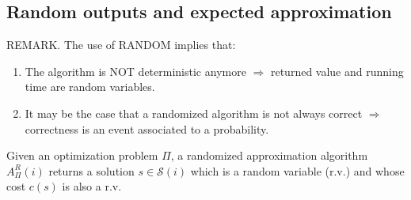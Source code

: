 \subsection{Random outputs and expected approximation}
\begin{notesresult}
REMARK. The use of RANDOM implies that:
\begin{enumerate}
\item The algorithm is NOT deterministic anymore
$\Rightarrow$ returned value and running time are random variables.
\item It may be the case that a randomized algorithm is not always correct
$\Rightarrow$ correctness is an event associated to a probability.
\end{enumerate}
\end{notesresult}
Given an optimization problem $\Pi$, a randomized approximation algorithm $A^R_\Pi(i)$ returns a solution $s\in\mathcal S(i)$ which is a random variable (r.v.) and whose cost $c(s)$ is also a r.v.

